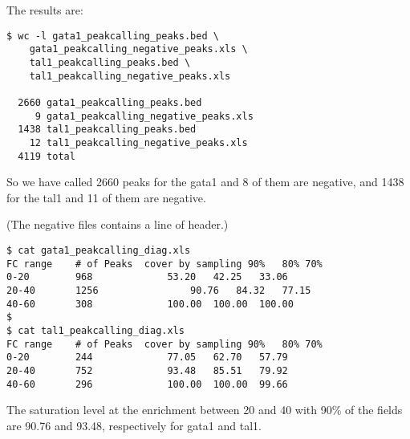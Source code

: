 \documentclass[11pt]{article} %
\begin{document}
The results are:

\begin{lstlisting}
$ wc -l gata1_peakcalling_peaks.bed \
    gata1_peakcalling_negative_peaks.xls \
    tal1_peakcalling_peaks.bed \
    tal1_peakcalling_negative_peaks.xls
    
  2660 gata1_peakcalling_peaks.bed
     9 gata1_peakcalling_negative_peaks.xls
  1438 tal1_peakcalling_peaks.bed
    12 tal1_peakcalling_negative_peaks.xls
  4119 total
\end{lstlisting}

So we have called 2660 peaks for the gata1 and 8 of them are negative, and 1438 for the tal1 and 11 of them are negative.

(The negative files contains a line of header.)
\begin{lstlisting}
$ cat gata1_peakcalling_diag.xls
FC range	# of Peaks	cover by sampling 90%	80%	70%	
0-20		968				53.20	42.25	33.06	
20-40		1256				90.76	84.32	77.15	
40-60		308				100.00	100.00	100.00	
$
$ cat tal1_peakcalling_diag.xls
FC range	# of Peaks	cover by sampling 90%	80%	70%	
0-20		244				77.05	62.70	57.79		
20-40		752				93.48	85.51	79.92		
40-60		296				100.00	100.00	99.66
\end{lstlisting}

The saturation level at the enrichment between 20 and 40 with 90\% of the fields are 90.76 and 93.48, respectively for gata1 and tal1.
\end{document}
